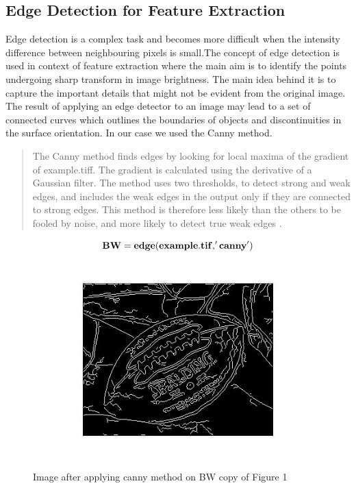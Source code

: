 \documentclass[12pt]{article}
\begin{document}
\subsection{Edge Detection for Feature Extraction}
    Edge detection is a complex task and becomes more difficult when the intensity difference between neighbouring pixels is small.The concept of edge detection is used in context of feature extraction where the main aim is to identify the points undergoing sharp transform in image brightness. The main idea behind it is to capture the important details that might not be evident from the original image. The result of applying an edge detector to an image may lead to a set of connected curves which outlines the boundaries of objects and discontinuities in the surface orientation. In our case we used the Canny method. 
\begin{quote}
The Canny method finds edges by looking for local maxima of the gradient of example.tiff. The gradient is calculated using the derivative of a Gaussian filter. The method uses two thresholds, to detect strong and weak edges, and includes the weak edges in the output only if they are connected to strong edges. This method is therefore less likely than the others to be fooled by noise, and more likely to detect true weak edges \cite{Mathworks}.
\end{quote}
\[{\bf BW = edge(example.tif,'canny')}\]
      \clearpage
      \begin{figure}
       \centering
      \includegraphics[scale=0.5]{footballcanny.jpg}
      \caption{Image after applying canny method on BW copy of Figure 1}
      \end{figure}
     
\end{document}
